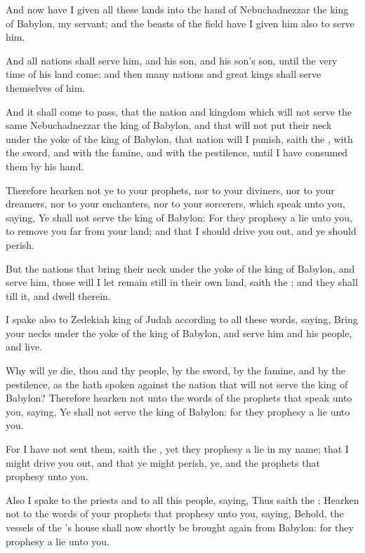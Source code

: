 \Verse And now have I given all these lands into the hand of Nebuchadnezzar the king of Babylon, my servant; and the beasts of the field have I given him also to serve him.

\Verse And all nations shall serve him, and his son, and his son's son, until the very time of his land come: and then many nations and great kings shall serve themselves of him.

\Verse And it shall come to pass, that the nation and kingdom which will not serve the same Nebuchadnezzar the king of Babylon, and that will not put their neck under the yoke of the king of Babylon, that nation will I punish, saith the \LORD, with the sword, and with the famine, and with the pestilence, until I have consumed them by his hand.

\Verse Therefore hearken not ye to your prophets, nor to your diviners, nor to your dreamers, nor to your enchanters, nor to your sorcerers, which speak unto you, saying, Ye shall not serve the king of Babylon: \Verse For they prophesy a lie unto you, to remove you far from your land; and that I should drive you out, and ye should perish.

\Verse But the nations that bring their neck under the yoke of the king of Babylon, and serve him, those will I let remain still in their own land, saith the \LORD; and they shall till it, and dwell therein.

\Verse I spake also to Zedekiah king of Judah according to all these words, saying, Bring your necks under the yoke of the king of Babylon, and serve him and his people, and live.

\Verse Why will ye die, thou and thy people, by the sword, by the famine, and by the pestilence, as the \LORD hath spoken against the nation that will not serve the king of Babylon?  \Verse Therefore hearken not unto the words of the prophets that speak unto you, saying, Ye shall not serve the king of Babylon: for they prophesy a lie unto you.

\Verse For I have not sent them, saith the \LORD, yet they prophesy a lie in my name; that I might drive you out, and that ye might perish, ye, and the prophets that prophesy unto you.

\Verse Also I spake to the priests and to all this people, saying, Thus saith the \LORD; Hearken not to the words of your prophets that prophesy unto you, saying, Behold, the vessels of the \LORD's house shall now shortly be brought again from Babylon: for they prophesy a lie unto you.

